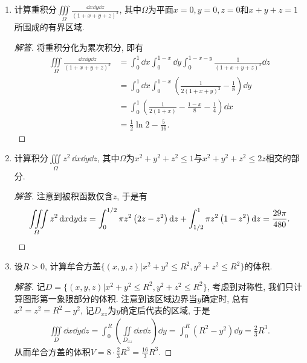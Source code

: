 \begin{quiza}
\begin{enumerate}
\item 计算重积分\(\iiint\limits_\varOmega \frac{\dd x\dd y \dd z}{(1+x+y+z)^3}\), 
其中\(\varOmega\)为平面\(x=0,y=0,z=0\)和\(x+y+z=1\)所围成的有界区域.
\begin{proof}[解答]
将重积分化为累次积分, 即有\[\begin{split}
\iiint\limits_{\varOmega}\frac{\dd x\dd y\dd z}{(1+x+y+z)^3}
&=\int_{0}^{1}\dd x\int_{0}^{1-x}\dd y\int_{0}^{1-x-y}\frac{1}{(1+x+y+z)^3}\dd z\\
&=\int_{0}^{1}\dd x\int_{0}^{1-x}\left(\frac{1}{2(1+x+y)^2}-\frac{1}{8}\right)\dd y\\
&=\int_{0}^{1}\left(\frac{1}{2(1+x)}-\frac{1-x}{8}-\frac{1}{4}\right)\dd x\\
&=\frac{1}{2}\ln 2-\frac{5}{16}.
\end{split}\]
\end{proof}

\item 计算积分\(\iiint\limits_\varOmega z^2\,\dd x\dd y \dd z\), 
其中\(\varOmega\)为\(x^2+y^2+z^2\leqslant 1\)与\(x^2+y^2+z^2\leqslant 2z\)相交的部分.
\begin{proof}[解答]
注意到被积函数仅含\(z\), 于是有
\[\iiint\limits_{\varOmega}z^2\,\mathrm{d} x\mathrm{d} y\mathrm{d} z
=\int_{0}^{1/2}\pi z^2\left(2z-z^2\right)\mathrm{d} z
+\int_{1/2}^{1}\pi z^2\left(1-z^2\right)\mathrm{d} z=\frac{29\pi}{480}.\qedhere\]
\end{proof}

\item 设\(R>0\), 计算牟合方盖\(\{(x,y,z)\big|x^2+y^2\leqslant R^2,y^2+z^2\leqslant R^2\}\)的体积.
\begin{proof}[解答]
记\(D=\{(x,y,z)\big|x^2+y^2\leqslant R^2,y^2+z^2\leqslant R^2\}\), 
考虑到对称性, 我们只计算图形第一象限部分的体积. 注意到该区域边界当\(y\)确定时, 
总有\(x^2=z^2=R^2-y^2\), 记\(D_{xz}\)为\(y\)确定后代表的区域, 于是\[\begin{split}
\iiint\limits_{D}\dd x\dd y\dd z=\int_{0}^{R}\left(\iint\limits_{D_{xz}}\dd x\dd z\right)\dd y
=\int_{0}^{R}\left(R^2-y^2\right)\dd y=\frac{2}{3}R^3.
\end{split}\]从而牟合方盖的体积\(V=8\cdot\frac{2}{3}R^3=\frac{16}{3}R^3.\)
\end{proof}


\end{enumerate}
\end{quiza}
